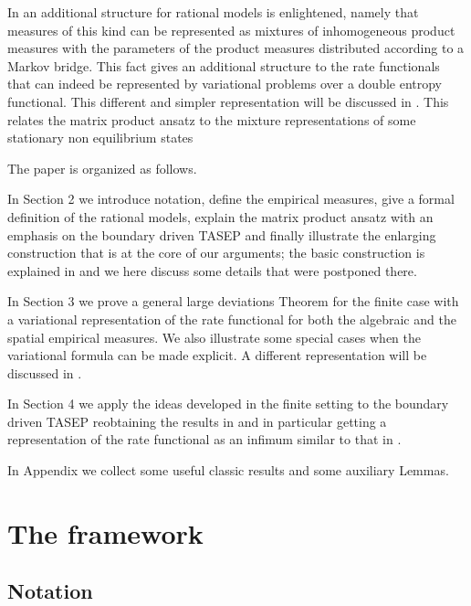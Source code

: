 \documentclass[reqno]{amsart}
\theoremstyle{plain}
\theoremstyle{definition}
\theoremstyle{remark}
\numberwithin{equation}{section}
\numberwithin{theorem}{section}
\newcommand{\<}{\langle}
\renewcommand{\>}{\rangle}
\begin{document}
	\smallskip
	In \cite{GI1} an additional structure for rational models is enlightened, namely that measures of this kind can be represented as mixtures of inhomogeneous product measures with the parameters of the product measures distributed according to a Markov bridge. This fact gives an additional structure to the rate functionals that can indeed be represented by variational problems over a double entropy functional. This different and simpler representation will be discussed in \cite{GGIM}. This relates the matrix product ansatz to the mixture representations of
	some stationary non equilibrium states \cite{CFGGT, dMFG, CFF, GRV, RV} 
	\smallskip
	
	The paper is organized as follows.
	
	In Section 2 we introduce notation, define the empirical measures, give a formal definition of the rational models, explain the matrix product ansatz with an emphasis on the boundary driven TASEP and finally illustrate the enlarging construction that is at the core of our arguments; the basic construction is explained in \cite{GI1} and we here discuss some details that were postponed there.
	
	In Section 3 we prove a general large deviations Theorem for the finite case with a variational representation of the  rate functional for both the algebraic and the spatial empirical measures.
	We also illustrate some special cases when the variational formula can be made explicit. A different representation will be discussed in \cite{GGIM}.
	
	In Section 4 we apply the ideas developed in the finite setting to the boundary driven TASEP reobtaining the results in \cite{Der5,Derr7} and in particular getting a representation of the rate functional as an infimum similar to that in \cite{Bryc}.
	
	In Appendix we collect some useful classic results and some auxiliary Lemmas.
	
	
	\section{The framework}\label{sec:frame}
	
	\subsection{Notation}
	
\end{document}
